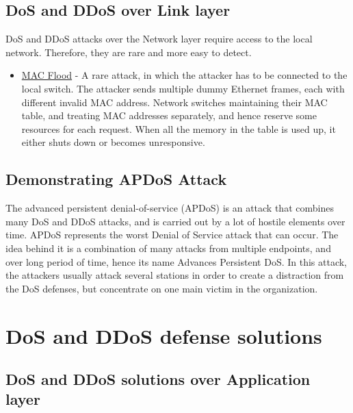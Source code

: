 \documentclass{report}
\begin{document}
\subsection {DoS and DDoS over Link layer}  

 \hfill \break DoS and DDoS attacks over the Network layer require access to the local network. Therefore, they are rare and more easy to detect.
\begin{itemize}
\item\underline{MAC Flood} - A rare attack, in which the attacker has to be connected to the local switch. The attacker sends multiple dummy Ethernet frames, each with different invalid MAC address. Network switches maintaining their MAC table, and treating MAC addresses separately, and hence reserve some resources for each request. When all the memory in the table is used up, it either shuts down or becomes unresponsive.
\end{itemize}


 \hfill \break
\subsection {Demonstrating APDoS Attack}

 \hfill \break The advanced persistent denial-of-service (APDoS) is an attack that combines many DoS and DDoS attacks, and is carried out by a lot of hostile elements over time. APDoS represents the worst Denial of Service attack that can occur. The idea behind it is a combination of many attacks from multiple endpoints, and over long period of time, hence its name Advances Persistent DoS. In this attack, the attackers usually attack several stations in order to create a distraction from the DoS defenses, but concentrate on one main victim in the organization.
\newpage
\section{DoS and DDoS defense solutions }

\subsection{DoS and DDoS solutions over Application layer}
 
\end{document}
